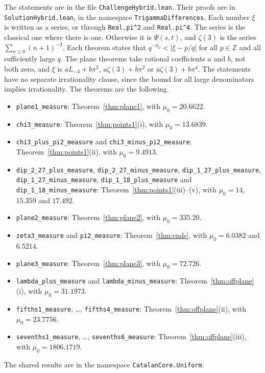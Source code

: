 \documentclass[11pt]{amsart}
\theoremstyle{definition}
\theoremstyle{remark}
\numberwithin{equation}{section}
\newcommand{\Z}{\mathbb Z}
\newcommand{\lean}[1]{\nolinkurl{#1}}
\newcommand{\Lt}{L_{-3}}             %
\newcommand{\MuLamU}{31.1973}
\newcommand{\MuThirdsU}{9.4913}
\newcommand{\MuFifthsU}{23.7756}
\newcommand{\MuSeventhsU}{1806.1719}
\newcommand{\MuChi}{13.6839}
\newcommand{\MuHalvesU}{6.5214}
\newcommand{\MuPlaneA}{20.6622}
\newcommand{\MuPlaneB}{335.20}
\newcommand{\MuPlaneC}{72.726}
\newcommand{\MuZetaThree}{6.0382}
\newcommand{\MuDipA}{14}
\newcommand{\MuDipB}{15.359}
\newcommand{\MuDipC}{17.492}
\begin{document}
The statements are in the file \lean{ChallengeHybrid.lean}. Their proofs are in \lean{SolutionHybrid.lean}, in the
namespace \lean{TrigammaDifferences}. Each number $\xi$ is written as a series, or through \lean{Real.pi^2} and \lean{Real.pi^4}. The
series is the classical one where there is one. Otherwise it is $\Psi(s,t)$, and $\zeta(3)$ is the series
$\sum_{n\ge0}(n+1)^{-3}$. Each theorem states that $q^{-\mu_0}<|\xi-p/q|$ for all $p\in\Z$ and all sufficiently
large $q$. The plane theorems take rational coefficients $a$ and $b$, not both zero, and $\xi$ is $a\Lt+b\pi^2$,
$a\zeta(3)+b\pi^2$ or $a\zeta(3)+b\pi^4$. The statements have no separate irrationality clause, since the bound for all large
denominators implies irrationality. The theorems are the following.
\begin{itemize}
\item \lean{plane1_measure}: Theorem~\ref{thm:plane1}, with $\mu_0=\MuPlaneA$.
\item \lean{chi3_measure}: Theorem~\ref{thm:points1}(i), with $\mu_0=\MuChi$.
\item \lean{chi3_plus_pi2_measure} and \lean{chi3_minus_pi2_measure}: Theorem~\ref{thm:points1}(ii), with
 $\mu_0=\MuThirdsU$.
\item \lean{dip_2_27_plus_measure}, \lean{dip_2_27_minus_measure}, \lean{dip_1_27_plus_measure},
 \lean{dip_1_27_minus_measure}, \lean{dip_1_18_plus_measure} and \lean{dip_1_18_minus_measure}:
 Theorem~\ref{thm:points1}(iii)--(v), with $\mu_0=\MuDipA$, $\MuDipB$ and $\MuDipC$.
\item \lean{plane2_measure}: Theorem~\ref{thm:plane2}, with $\mu_0=\MuPlaneB$.
\item \lean{zeta3_measure} and \lean{pi2_measure}: Theorem~\ref{thm:ends}, with $\mu_0=\MuZetaThree$ and
 $\MuHalvesU$.
\item \lean{plane3_measure}: Theorem~\ref{thm:plane3}, with $\mu_0=\MuPlaneC$.
\item \lean{lambda_plus_measure} and \lean{lambda_minus_measure}: Theorem~\ref{thm:offplane}(i), with
 $\mu_0=\MuLamU$.
\item \lean{fifths1_measure}, \dots, \lean{fifths4_measure}: Theorem~\ref{thm:offplane}(ii), with
 $\mu_0=\MuFifthsU$.
\item \lean{sevenths1_measure}, \dots, \lean{sevenths6_measure}: Theorem~\ref{thm:offplane}(iii), with
 $\mu_0=\MuSeventhsU$.
\end{itemize}
The shared results are in the namespace \lean{CatalanCore.Uniform}.
\end{document}
